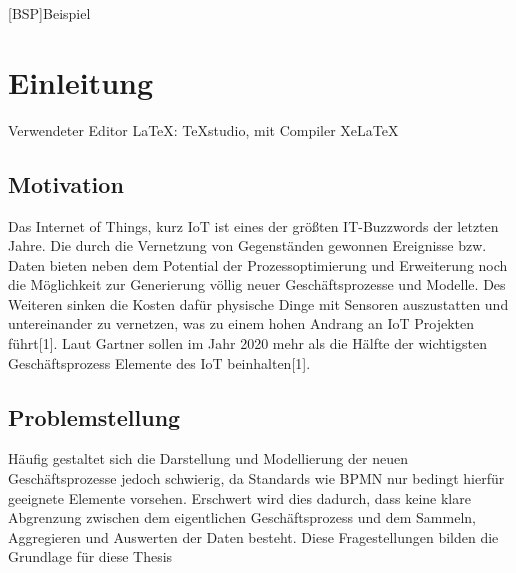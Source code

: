 \documentclass[a4paper, 12pt, twoside, headsepline=true]{scrartcl} %
\begin{document}
\tableofcontents
\clearpage
\newpage


\begin{acronym}[header=Abkürzungsverzeichnis]
	[BSP]{Beispiel}
\end{acronym}

\clearpage

\listoftables
\clearpage

\listoffigures
\clearpage


\section{Einleitung} \label{sec:section}
Verwendeter Editor LaTeX: TeXstudio, mit Compiler XeLaTeX

\subsection{Motivation} \label{sec:subsection}
Das Internet of Things, kurz IoT ist eines der größten IT-Buzzwords
der letzten Jahre. Die durch die Vernetzung von Gegenständen
gewonnen Ereignisse bzw. Daten bieten neben dem Potential der
Prozessoptimierung und Erweiterung noch die Möglichkeit zur
Generierung völlig neuer Geschäftsprozesse und Modelle. Des
Weiteren sinken die Kosten dafür physische Dinge mit Sensoren
auszustatten und untereinander zu vernetzen, was zu einem hohen
Andrang an IoT Projekten führt[1]. Laut Gartner sollen im Jahr 2020
mehr als die Hälfte der wichtigsten Geschäftsprozess Elemente des IoT
beinhalten[1]. 

\subsection{Problemstellung} 
Häufig gestaltet sich die Darstellung und Modellierung
der neuen Geschäftsprozesse jedoch schwierig, da Standards wie
BPMN nur bedingt hierfür geeignete Elemente vorsehen. Erschwert
wird dies dadurch, dass keine klare Abgrenzung zwischen dem
eigentlichen Geschäftsprozess und dem Sammeln, Aggregieren und
Auswerten der Daten besteht. Diese Fragestellungen bilden die
Grundlage für diese Thesis
\end{document}
